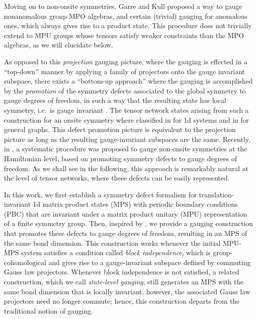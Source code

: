 \documentclass[reprint,
superscriptaddress,
amsmath,amssymb,
notitlepage,
aps,
prb,
10pt, 
tightenlines
]{revtex4-2}
\begin{document}
Moving on to non-onsite symmetries, Garre and Kull \cite{GarreKull} proposed a way to gauge nonanomalous group MPO algebras, and certain (trivial) gauging for anomalous ones, which always gives rise to a product state. This procedure does not trivially extend to MPU groups whose tensors satisfy weaker constraints than the MPO algebras, as we will elucidate below.

As opposed to this \textit{projection} gauging picture, where the gauging is effected in a ``top-down'' manner by applying a family of projectors onto the gauge invariant subspace, there exists a ``bottom-up approach'' where the gauging is accomplished by the \textit{promotion} of the symmetry defects associated to the global symmetry to gauge degrees of freedom, in such a way that the resulting state has local symmetry, i.e.~is gauge invariant \cite{Barkeshli19}. The tensor network states arising from such a construction for an onsite symmetry where classified in \cite{KULL2017199} for 1d systems and in \cite{Blanik_2025} for general graphs. This defect promotion picture is equivalent to the projection picture as long as the resulting gauge-invariant subspaces are the same. Recently, in \cite{Seifnashri}, a systematic procedure was proposed to gauge non-onsite symmetries at the Hamiltonian level, based on promoting symmetry defects to gauge degrees of freedom. As we shall see in the following, this approach is remarkably natural at the level of tensor networks, where these defects can be easily represented. 

In this work, we first establish a symmetry defect formalism for translation-invariant 1d matrix product states (MPS) with periodic boundary conditions (PBC) that are invariant under a matrix product unitary (MPU) representation of a finite symmetry group. Then, inspired by \cite{Seifnashri}, we provide a gauging construction that promotes these defects to gauge degrees of freedom, resulting in an MPS of the same bond dimension. This construction works whenever the initial MPU-MPS system satisfies a condition called \textit{block independence}, which is group-cohomological and gives rise to a gauge-invariant subspace defined by commuting Gauss law projectors. Whenever block independence is not satisfied, a related construction, which we call \textit{state-level gauging}, still generates an MPS with the same bond dimension that is locally invariant, however, the associated Gauss law projectors need no longer commute; hence, this construction departs from the traditional notion of gauging.
\end{document}
